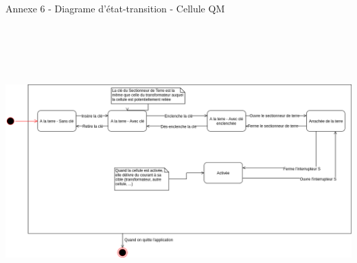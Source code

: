 \documentclass[a4paper]{article}
\begin{document}
    \vfill
    \huge Annexe 6 - Diagrame d'état-transition - Cellule QM \\
    \vspace{10pt}
    \includegraphics[width=16.5cm,height=12cm]{img/DiagEtatTransitionQM}
    \vfill

    \newpage
\end{document}

